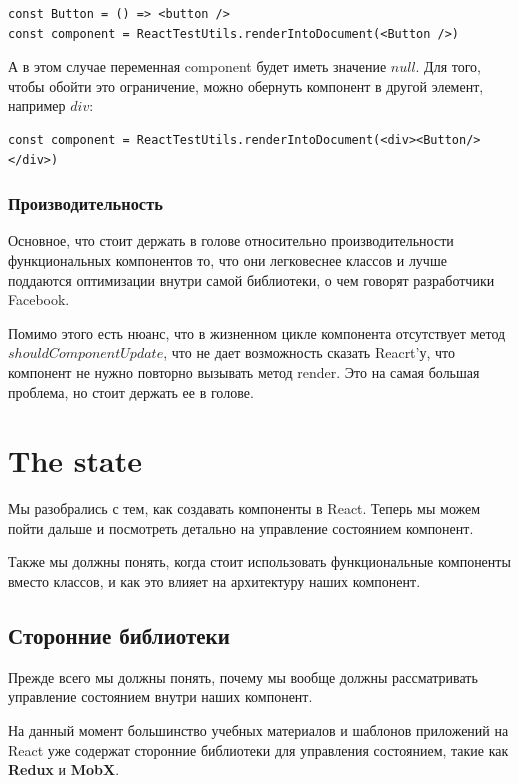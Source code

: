 \begin{lstlisting}
const Button = () => <button />
const component = ReactTestUtils.renderIntoDocument(<Button />)
\end{lstlisting}

А в этом случае переменная component будет иметь значение $null$. Для того, чтобы обойти это ограничение, можно обернуть компонент в другой элемент, например $div$:

\begin{lstlisting}
const component = ReactTestUtils.renderIntoDocument(<div><Button/></div>)
\end{lstlisting}

\subsubsection{Производительность}

Основное, что стоит держать в голове относительно производительности функциональных компонентов то, что они легковеснее классов и лучше поддаются оптимизации внутри самой библиотеки, о чем говорят разработчики Facebook. 

Помимо этого есть нюанс, что в жизненном цикле компонента отсутствует метод $shouldComponentUpdate$, что не дает возможность сказать Reacrt'у, что компонент не нужно повторно вызывать метод render. Это на самая большая проблема, но стоит держать ее в голове.


\section{The state}

Мы разобрались с тем, как создавать компоненты в React.
Теперь мы можем пойти дальше и посмотреть детально на управление состоянием компонент.

Также мы должны понять, когда стоит использовать функциональные компоненты вместо классов, и как это влияет на архитектуру наших компонент. 

\subsection{Сторонние библиотеки}

Прежде всего мы должны понять, почему мы вообще должны рассматривать управление состоянием внутри наших компонент. 

На данный момент большинство учебных материалов и шаблонов приложений на React уже содержат сторонние библиотеки для управления состоянием, такие как \textbf{Redux} и \textbf{MobX}.

